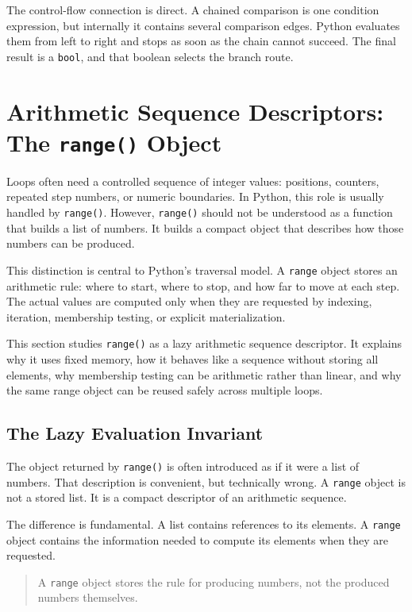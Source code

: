 \documentclass[a4paper,twoside]{report}
\begin{document}
The control-flow connection is direct. A chained comparison is one condition expression, but internally it contains several comparison edges. Python evaluates them from left to right and stops as soon as the chain cannot succeed. The final result is a \texttt{bool}, and that boolean selects the branch route.

\section{Arithmetic Sequence Descriptors: The \texttt{range()} Object}

Loops often need a controlled sequence of integer values: positions, counters, repeated step numbers, or numeric boundaries. In Python, this role is usually handled by \texttt{range()}. However, \texttt{range()} should not be understood as a function that builds a list of numbers. It builds a compact object that describes how those numbers can be produced.

This distinction is central to Python's traversal model. A \texttt{range} object stores an arithmetic rule: where to start, where to stop, and how far to move at each step. The actual values are computed only when they are requested by indexing, iteration, membership testing, or explicit materialization.

This section studies \texttt{range()} as a lazy arithmetic sequence descriptor. It explains why it uses fixed memory, how it behaves like a sequence without storing all elements, why membership testing can be arithmetic rather than linear, and why the same range object can be reused safely across multiple loops.

\subsection{The Lazy Evaluation Invariant}

The object returned by \texttt{range()} is often introduced as if it were a list of numbers. That description is convenient, but technically wrong. A \texttt{range} object is not a stored list. It is a compact descriptor of an arithmetic sequence.

The difference is fundamental. A list contains references to its elements. A \texttt{range} object contains the information needed to compute its elements when they are requested.

\begin{quote}
A \texttt{range} object stores the rule for producing numbers, not the produced numbers themselves.
\end{quote}
\end{document}
